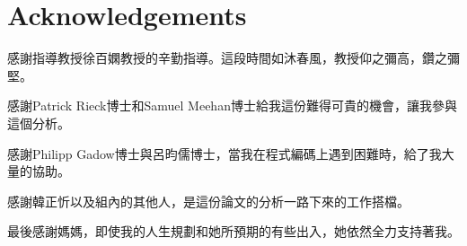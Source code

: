 \documentclass[class=NTHU_thesis, crop=false]{standalone}
\begin{document}
\chapter{Acknowledgements}
感謝指導教授徐百嫻教授的辛勤指導。這段時間如沐春風，教授仰之彌高，鑽之彌堅。
\newline

感謝Patrick Rieck博士和Samuel Meehan博士給我這份難得可貴的機會，讓我參與這個分析。
\newline

感謝Philipp Gadow博士與呂昀儒博士，當我在程式編碼上遇到困難時，給了我大量的協助。
\newline

感謝韓正忻以及組內的其他人，是這份論文的分析一路下來的工作搭檔。
\newline

最後感謝媽媽，即使我的人生規劃和她所預期的有些出入，她依然全力支持著我。
\end{document}
